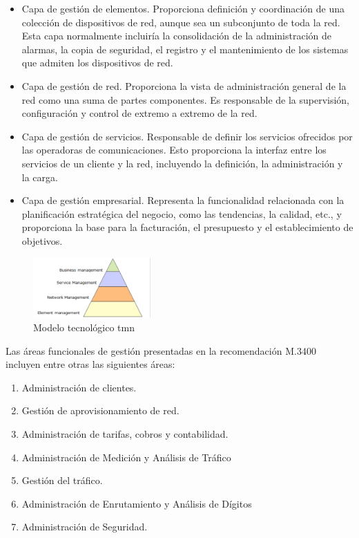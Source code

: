 \begin{itemize}
\item Capa de gestión de elementos. Proporciona definición y coordinación de una colección de dispositivos de red, aunque sea un subconjunto de toda la red. Esta capa normalmente incluiría la consolidación de la administración de alarmas, la copia de seguridad, el registro y el mantenimiento de los sistemas que admiten los dispositivos de red.
\item Capa de gestión de red. Proporciona la vista de administración general de la red como una suma de partes componentes. Es responsable de la supervisión, configuración y control de extremo a extremo de la red.
\item Capa de gestión de servicios. Responsable de definir los servicios ofrecidos por las operadoras de comunicaciones. Esto proporciona la interfaz entre los servicios de un cliente y la red, incluyendo la definición, la administración y la carga.
\item Capa de gestión empresarial. Representa la funcionalidad relacionada con la planificación estratégica del negocio, como las tendencias, la calidad, etc., y proporciona la base para la facturación, el presupuesto y el establecimiento de objetivos.
\end{itemize}


\begin{figure}[H]
  \centering
  \includegraphics[width=0.40\textwidth]{imaxes/piramide-tmn.png}
  \caption{Modelo tecnológico \acrshort{tmn}}
  \label{fig:pirámide-tmn}
\end{figure}


Las áreas funcionales de gestión presentadas en la recomendación M.3400 incluyen entre otras las siguientes áreas: 
\begin{enumerate}
\item Administración de clientes.
\item Gestión de aprovisionamiento de red.
\item Administración de tarifas, cobros y contabilidad.
\item Administración de Medición y Análisis de Tráfico
\item Gestión del tráfico.
\item Administración de Enrutamiento y Análisis de Dígitos
\item Administración de Seguridad.
\end{enumerate}


